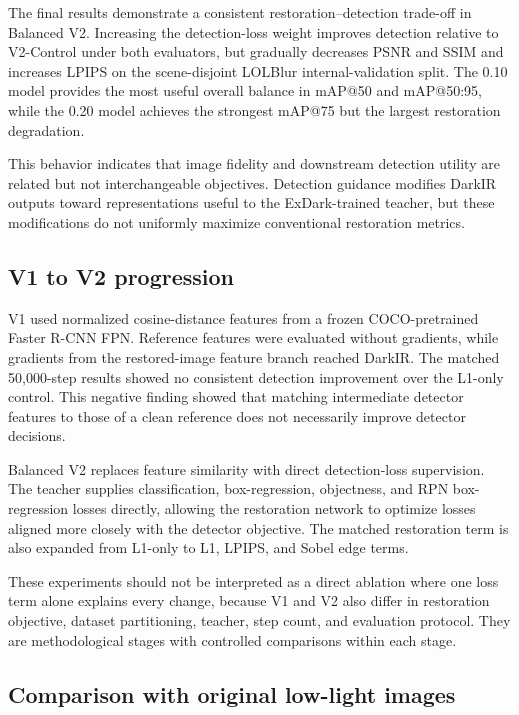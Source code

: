 The final results demonstrate a consistent restoration--detection
trade-off in Balanced V2. Increasing the detection-loss weight improves
detection relative to V2-Control under both evaluators, but gradually
decreases PSNR and SSIM and increases LPIPS on the scene-disjoint LOLBlur
internal-validation split. The 0.10 model provides the most useful overall
balance in mAP@50 and mAP@50:95, while the 0.20 model achieves the
strongest mAP@75 but the largest restoration degradation.

This behavior indicates that image fidelity and downstream detection
utility are related but not interchangeable objectives. Detection guidance
modifies DarkIR outputs toward representations useful to the ExDark-trained
teacher, but these modifications do not uniformly maximize conventional
restoration metrics.

\subsection{V1 to V2 progression}

V1 used normalized cosine-distance features from a frozen
COCO-pretrained Faster R-CNN FPN. Reference features were evaluated
without gradients, while gradients from the restored-image feature branch
reached DarkIR. The matched 50,000-step results showed no consistent
detection improvement over the L1-only control. This negative finding
showed that matching intermediate detector features to those of a clean
reference does not necessarily improve detector decisions.

Balanced V2 replaces feature similarity with direct detection-loss
supervision. The teacher supplies classification, box-regression,
objectness, and RPN box-regression losses directly, allowing the
restoration network to optimize losses aligned more closely with the
detector objective. The matched restoration term is also expanded from
L1-only to L1, LPIPS, and Sobel edge terms.

These experiments should not be interpreted as a direct ablation where
one loss term alone explains every change, because V1 and V2 also differ
in restoration objective, dataset partitioning, teacher, step count, and
evaluation protocol. They are methodological stages with controlled
comparisons within each stage.

\subsection{Comparison with original low-light images}

